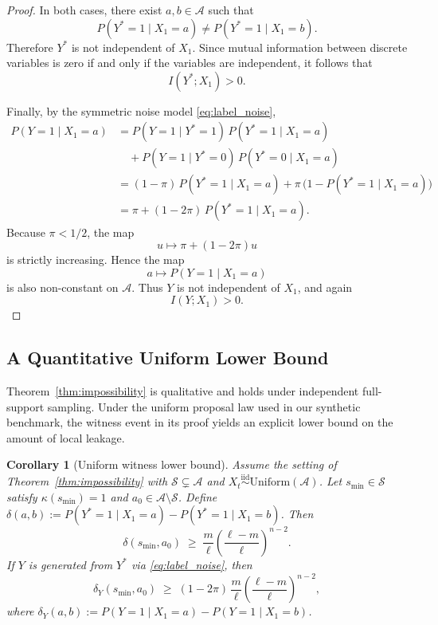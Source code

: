 \documentclass{article}
\theoremstyle{plain}
\newtheorem{corollary}[theorem]{Corollary}
\theoremstyle{definition}
\theoremstyle{remark}
\begin{document}
\begin{proof}
In both cases, there exist $a,b\in\mathcal{A}$ such that
\[
P(Y^*=1\mid X_1=a)\neq P(Y^*=1\mid X_1=b).
\]
Therefore $Y^*$ is not independent of $X_1$. Since mutual information
between discrete variables is zero if and only if the variables are
independent, it follows that
\[
I(Y^*;X_1)>0.
\]

Finally, by the symmetric noise model \eqref{eq:label_noise},
\begin{align*}
P(Y=1\mid X_1=a)
&=
P(Y=1\mid Y^*=1)\,P(Y^*=1\mid X_1=a)
\\
&\quad+
P(Y=1\mid Y^*=0)\,P(Y^*=0\mid X_1=a)
\\
&=
(1-\pi)\,P(Y^*=1\mid X_1=a)
+
\pi\,\bigl(1-P(Y^*=1\mid X_1=a)\bigr)
\\
&=
\pi + (1-2\pi)\,P(Y^*=1\mid X_1=a).
\end{align*}
Because $\pi<1/2$, the map
\[
u \longmapsto \pi + (1-2\pi)u
\]
is strictly increasing. Hence the map
\[
a \longmapsto P(Y=1\mid X_1=a)
\]
is also non-constant on $\mathcal{A}$. Thus $Y$ is not independent of $X_1$,
and again
\[
I(Y;X_1)>0.
\]
\end{proof}

\subsection{A Quantitative Uniform Lower Bound}
\label{sec:uniform_witness_bound}

Theorem~\ref{thm:impossibility} is qualitative and holds under independent full-support sampling. Under the uniform proposal law used in our synthetic benchmark, the witness event in its proof yields an explicit lower bound on the amount of local leakage.

\begin{corollary}[Uniform witness lower bound]
\label{cor:uniform_witness_bound}
Assume the setting of Theorem~\ref{thm:impossibility} with
$\mathcal{S}\subsetneq\mathcal{A}$ and
$X_t \overset{\mathrm{iid}}{\sim} \mathrm{Uniform}(\mathcal{A})$.
Let $s_{\min}\in\mathcal{S}$ satisfy $\kappa(s_{\min})=1$ and
$a_0\in\mathcal{A}\setminus\mathcal{S}$. Define
$\delta(a,b) := P(Y^*\!=\!1\mid X_1\!=\!a)
              - P(Y^*\!=\!1\mid X_1\!=\!b)$.
Then
\begin{equation}
\label{eq:witness_clean}
\delta(s_{\min},a_0)
\;\ge\;
\frac{m}{\ell}
\!\left(\frac{\ell-m}{\ell}\right)^{\!n-2}.
\end{equation}
If $Y$ is generated from $Y^*$ via \eqref{eq:label_noise}, then
\begin{equation}
\label{eq:witness_noisy}
\delta_Y(s_{\min},a_0)
\;\ge\;
(1-2\pi)\,\frac{m}{\ell}
\!\left(\frac{\ell-m}{\ell}\right)^{\!n-2},
\end{equation}
where
$\delta_Y(a,b) := P(Y\!=\!1\mid X_1\!=\!a)
                 - P(Y\!=\!1\mid X_1\!=\!b)$.
\end{corollary}
\end{document}
